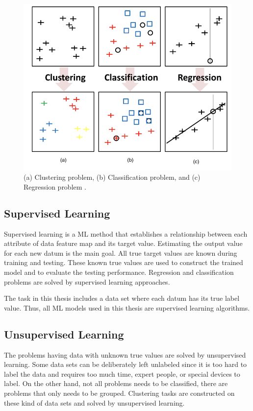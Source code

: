 \begin{figure}[h]
	\centering
	\includegraphics[width=.8\linewidth]{fig/clustering_classification_regression.png}
	\caption{(a) Clustering problem, (b) Classification problem, and (c) Regression problem \cite{parallel_linear_algebra}.}
	\label{clustering_classification_regression}
\end{figure}

\newpage

\subsection{Supervised Learning}

Supervised learning is a ML method that establishes a relationship between each attribute of data feature map and its target value. Estimating the output value for each new datum is the main goal. All true target values are known during training and testing. These known true values are used to construct the trained model and to evaluate the testing performance. Regression and classification problems are solved by supervised learning approaches.

The task in this thesis includes a data set where each datum has its true label value. Thus, all ML models used in this thesis are supervised learning algorithms.

\subsection{Unsupervised Learning}

The problems having data with unknown true values are solved by unsupervised learning. Some data sets can be deliberately left unlabeled since it is too hard to label the data and requires too much time, expert people, or special devices to label. On the other hand, not all problems needs to be classified, there are problems that only needs to be grouped. Clustering tasks are constructed on these kind of data sets and solved by unsupervised learning.

